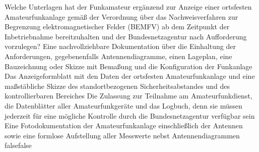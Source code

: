     {Welche Unterlagen hat der Funkamateur ergänzend zur Anzeige einer ortsfesten Amateurfunkanlage gemäß der Verordnung über das Nachweisverfahren zur Begrenzung elektromagnetischer Felder (BEMFV) ab dem Zeitpunkt der Inbetriebnahme bereitzuhalten und der Bundesnetzagentur nach Aufforderung vorzulegen?}
    {Eine nachvollziehbare Dokumentation über die Einhaltung der Anforderungen, gegebenenfalls Antennendiagramme, einen Lageplan, eine Bauzeichnung oder Skizze mit Bemaßung und die Konfiguration der Funkanlage}
    {Das Anzeigeformblatt mit den Daten der ortsfesten Amateurfunkanlage und eine maßstäbliche Skizze des standortbezogenen Sicherheitsabstandes und des kontrollierbaren Bereiches}
    {Die Zulassung zur Teilnahme am Amateurfunkdienst, die Datenblätter aller Amateurfunkgeräte und das Logbuch, denn sie müssen jederzeit für eine mögliche Kontrolle durch die Bundesnetzagentur verfügbar sein}
    {Eine Fotodokumentation der Amateurfunkanlage einschließlich der Antennen sowie eine formlose Aufstellung aller Messwerte nebst Antennendiagrammen}
    {false}{false}